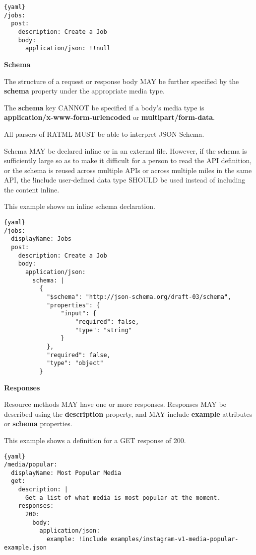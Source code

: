 \begin{lstlisting}{yaml}
/jobs:
  post:
    description: Create a Job
    body:
      application/json: !!null
\end{lstlisting}

\textbf{Schema}

The structure of a request or response body MAY be further specified by the \textbf{schema} property under the appropriate media type.

The \textbf{schema} key CANNOT be specified if a body's media type is \textbf{application/x-www-form-urlencoded} or \textbf{multipart/form-data}.

All parsers of RATML MUST be able to interpret JSON Schema.

Schema MAY be declared inline or in an external file. However, if the schema is sufficiently large so as to make it difficult for a person to read the API definition, or the schema is reused across multiple APIs or across multiple miles in the same API, the !include user-defined data type SHOULD be used instead of including the content inline.

This example shows an inline schema declaration.

\begin{lstlisting}{yaml}
/jobs:
  displayName: Jobs
  post:
    description: Create a Job
    body:
      application/json:
        schema: |
          {
            "$schema": "http://json-schema.org/draft-03/schema",
            "properties": {
                "input": {
                    "required": false,
                    "type": "string"
                }
            },
            "required": false,
            "type": "object"
          }
\end{lstlisting}

\textbf{Responses}

Resource methods MAY have one or more responses. Responses MAY be described using the \textbf{description} property, and MAY include \textbf{example} attributes or \textbf{schema} properties.

This example shows a definition for a GET response of 200.

\begin{lstlisting}{yaml}
/media/popular:
  displayName: Most Popular Media
  get:
    description: |
      Get a list of what media is most popular at the moment.
    responses:
      200:
        body:
          application/json:
            example: !include examples/instagram-v1-media-popular-example.json
\end{lstlisting}

